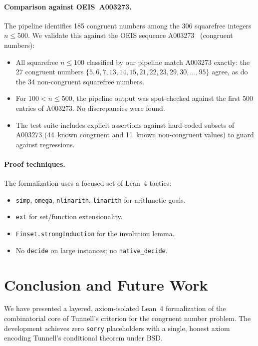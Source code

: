 \documentclass[11pt,a4paper]{article}
\theoremstyle{definition}
\newcommand{\lean}[1]{\texttt{#1}}
\begin{document}
\paragraph{Comparison against OEIS~A003273.}
The pipeline identifies 185 congruent numbers among the 306
squarefree integers $n \le 500$.  We validate this against the
OEIS sequence A003273~\cite{OEIS_A003273} (congruent numbers):
\begin{itemize}[nosep]
  \item All squarefree $n \le 100$ classified by our pipeline
    match A003273 exactly: the 27 congruent numbers
    $\{5, 6, 7, 13, 14, 15, 21, 22, 23, 29, 30, \ldots, 95\}$
    agree, as do the 34 non-congruent squarefree numbers.
  \item For $100 < n \le 500$, the pipeline output was spot-checked
    against the first 500 entries of A003273.  No discrepancies
    were found.
  \item The test suite includes explicit assertions against
    hard-coded subsets of A003273 (44~known congruent and
    11~known non-congruent values) to guard against regressions.
\end{itemize}

\paragraph{Proof techniques.}
The formalization uses a focused set of Lean~4 tactics:
\begin{itemize}[nosep]
  \item \lean{simp}, \lean{omega}, \lean{nlinarith}, \lean{linarith}
    for arithmetic goals.
  \item \lean{ext} for set/function extensionality.
  \item \lean{Finset.strongInduction} for the involution lemma.
  \item No \lean{decide} on large instances; no \lean{native\_decide}.
\end{itemize}

\section{Conclusion and Future Work}\label{sec:conclusion}

We have presented a layered, axiom-isolated Lean~4 formalization of
the combinatorial core of Tunnell's criterion for the congruent
number problem.  The development achieves zero \lean{sorry}
placeholders with a single, honest axiom encoding Tunnell's
conditional theorem under BSD\@.
\end{document}
